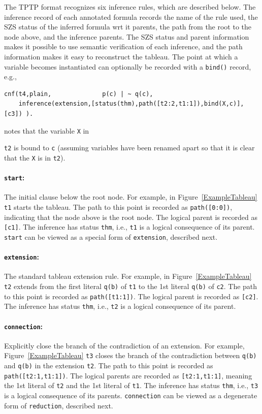 \documentclass[runningheads]{llncs}
\newcommand{\smalltt}[1]{\small \texttt{#1}}
\newcommand{\mytilde}{\raisebox{0.4ex}{\texttildelow}}
\begin{document}
The TPTP format recognizes six inference rules, which are described below.
The inference record of each annotated formula records the name of the rule used, the SZS status 
of the inferred formula wrt it parents, the path from the root to the node above, and the 
inference parents.  
The SZS status and parent information makes it possible to use semantic verification of each 
inference, and the path information makes it easy to reconstruct the tableau.
The point at which a variable becomes instantiated can optionally be recorded with a {\tt bind()} 
record, e.g., 
{\footnotesize
\begin{verbatim}
cnf(t4,plain,              p(c) | ~ q(c),
    inference(extension,[status(thm),path([t2:2,t1:1]),bind(X,c)],[c3]) ).
\end{verbatim}
}
\noindent
notes that the variable {\smalltt{X}} in {\smalltt{t2} is bound to {\smalltt{c}} (assuming 
variables have been renamed apart so that it is clear that the {\smalltt X} is in {\smalltt{t2}}).

\paragraph{{\tt start}:} The initial clause below the root node.
For example, in Figure~\ref{ExampleTableau} {\smalltt{t1}} starts the tableau.
The path to this point is recorded as {\smalltt{path([0:0])}}, indicating that the node above
is the root node.
The logical parent is recorded as {\smalltt{[c1]}}. 
The inference has status {\smalltt{thm}}, i.e., {\smalltt{t1}} is a logical consequence of its
parent.
{\tt start} can be viewed as a special form of {\tt extension}, described next.

\paragraph{{\tt extension}:} The standard tableau extension rule.
For example, in Figure~\ref{ExampleTableau} {\smalltt{t2}} extends from the first literal 
{\smalltt{q(b)}} of {\smalltt{t1}} to the 1st literal {\smalltt{{\mytilde}q(b)}} of {\smalltt{c2}}.
The path to this point is recorded as {\smalltt{path([t1:1])}}. 
The logical parent is recorded as {\smalltt{[c2]}}. 
The inference has status {\smalltt{thm}}, i.e., {\smalltt{t2}} is a logical consequence of its
parent.

\paragraph{{\tt connection}:} Explicitly close the branch of the contradiction of an extension.
For example, Figure~\ref{ExampleTableau} {\smalltt{t3}} closes the branch of the contradiction 
between {\smalltt{q(b)}} and {\smalltt{{\mytilde}q(b)}} in the extension {\smalltt{t2}}.
The path to this point is recorded as {\smalltt{path([t2:1,t1:1])}}.
The logical parents are recorded as {\smalltt{[t2:1,t1:1]}}, meaning the 1st literal of 
{\smalltt{t2}} and the 1st literal of {\smalltt{t1}}. 
The inference has status {\smalltt{thm}}, i.e., {\smalltt{t3}} is a logical consequence of its
parents. 
{\tt connection} can be viewed as a degenerate form of {\tt reduction}, described next.

}
\end{document}
